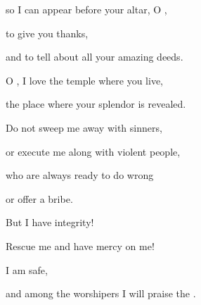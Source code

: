 {\par }{\Q so I can appear
before your altar,
O
{},
\par }{\Q {}to give
you thanks,
\par }{\Q and to tell
about all
your amazing deeds.
\par }{\Q {}O
{}, I love
the temple
where you live,
\par }{\Q the place
where your splendor
is revealed.
\par }{\Q {}Do not
sweep
me away
with
sinners,
\par }{\Q or execute
me along with
violent
people,
\par }{\Q {}who
are always ready to do wrong
\par }{\Q or offer a bribe.
\par }{\Q {}But I
have integrity!

\par }{\Q Rescue
me and have mercy on me!
\par }{\Q {}I am safe,

\par }{\Q and among the worshipers
I will praise
the {}.


\par }
